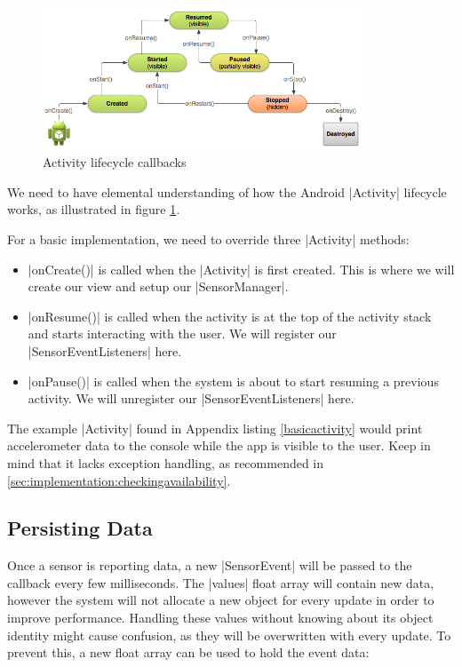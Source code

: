 \begin{figure}[H]
	\centering
	\includegraphics[width=0.85\textwidth]{images/activity_lifecycle.png}
	\caption[Caption for activity_lifecycle]{Activity lifecycle callbacks\footnotemark}
	\label{fig:activityLifecycle}
\end{figure}

We need to have elemental understanding of how the Android |Activity|\cite{androiddocs:activity} lifecycle works, as illustrated in figure \ref{fig:activityLifecycle}.

\clearpage

For a basic implementation, we need to override three |Activity| methods:

\begin{itemize}[noitemsep]
	\item |onCreate()| is called when the |Activity| is first created.
	This is where we will create our view and setup our |SensorManager|.
	\item |onResume()| is called when the activity is at the top of the activity stack and starts interacting with the user.
	We will register our \\|SensorEventListeners| here.
	\item |onPause()| is called when the system is about to start resuming a previous activity.
	We will unregister our |SensorEventListeners| here.
\end{itemize}

The example |Activity| found in Appendix listing \ref{basicactivity} would print accelerometer data to the console while the app is visible to the user.
Keep in mind that it lacks exception handling, as recommended in \ref{sec:implementation:checkingavailability}.

\subsection{Persisting Data}
Once a sensor is reporting data, a new |SensorEvent| will be passed to the callback every few milliseconds.
The |values| float array will contain new data, however the system will not allocate a new object for every update in order to improve performance.
Handling these values without knowing about its object identity might cause confusion, as they will be overwritten with every update.
To prevent this, a new float array can be used to hold the event data:

